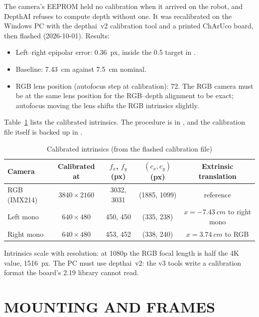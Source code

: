 The camera's EEPROM held no calibration when it arrived on the robot, and
DepthAI refuses to compute depth without one. It was recalibrated on the
Windows PC with the depthai~v2 calibration tool and a printed ChArUco board,
then flashed (2026-10-01). Results:
\begin{itemize}
\item Left--right epipolar error: 0.36~px, inside the \num{0.5} target in
  .
\item Baseline: \SI{7.43}{cm} against \SI{7.5}{cm} nominal.
\item RGB lens position (autofocus step at calibration): 72. The RGB camera
  must be at the same lens position for the RGB--depth alignment to be
  exact; autofocus moving the lens shifts the RGB intrinsics slightly.
\end{itemize}
Table~\ref{tab:oakcal} lists the calibrated intrinsics. The procedure is in
, and the calibration file itself is backed up in
.

\begin{table}[htbp]
\centering
\caption{Calibrated intrinsics (from the flashed calibration file)}
\label{tab:oakcal}
\small
\begin{tabular}{lcccc}
\toprule
Camera & Calibrated at & $f_x$, $f_y$ (px) & $(c_x,c_y)$ (px) & Extrinsic translation \\
\midrule
RGB (IMX214) & $3840\times2160$ & 3032, 3031 & (1885, 1099) & reference \\
Left mono & $640\times480$ & 450, 450 & (335, 238) & $x=\SI{-7.43}{cm}$ to right mono \\
Right mono & $640\times480$ & 453, 452 & (338, 240) & $x=\SI{+3.74}{cm}$ to RGB \\
\bottomrule
\end{tabular}
\end{table}
\noindent Intrinsics scale with resolution: at 1080p the RGB focal length is
half the 4K value, \SI{1516}{px}. The PC must use depthai~v2:
the v3 tools write a calibration format the board's 2.19 library cannot read.

\section{MOUNTING AND FRAMES}
\label{sec:oakframes}

